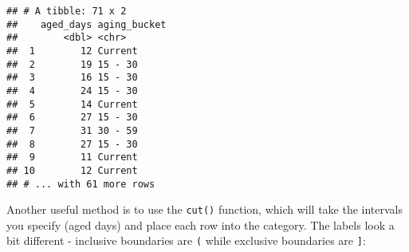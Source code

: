 \documentclass[
]{book}
\newenvironment{Shaded}{\begin{snugshade}}{\end{snugshade}}
\newcommand{\CommentTok}[1]{\textcolor[rgb]{0.56,0.35,0.01}{\textit{#1}}}
\newcommand{\DataTypeTok}[1]{\textcolor[rgb]{0.13,0.29,0.53}{#1}}
\newcommand{\DecValTok}[1]{\textcolor[rgb]{0.00,0.00,0.81}{#1}}
\newcommand{\KeywordTok}[1]{\textcolor[rgb]{0.13,0.29,0.53}{\textbf{#1}}}
\newcommand{\NormalTok}[1]{#1}
\newcommand{\OperatorTok}[1]{\textcolor[rgb]{0.81,0.36,0.00}{\textbf{#1}}}
\newcommand{\OtherTok}[1]{\textcolor[rgb]{0.56,0.35,0.01}{#1}}
\newcommand{\StringTok}[1]{\textcolor[rgb]{0.31,0.60,0.02}{#1}}
\begin{document}
\begin{Shaded}
\end{Shaded}

\begin{verbatim}
## # A tibble: 71 x 2
##    aged_days aging_bucket
##        <dbl> <chr>       
##  1        12 Current     
##  2        19 15 - 30     
##  3        16 15 - 30     
##  4        24 15 - 30     
##  5        14 Current     
##  6        27 15 - 30     
##  7        31 30 - 59     
##  8        27 15 - 30     
##  9        11 Current     
## 10        12 Current     
## # ... with 61 more rows
\end{verbatim}

Another useful method is to use the \texttt{cut()} function, which will take the intervals you specify (aged days) and place each row into the category. The labels look a bit different - inclusive boundaries are \texttt{(} while exclusive boundaries are \texttt{{]}}:
\end{document}
